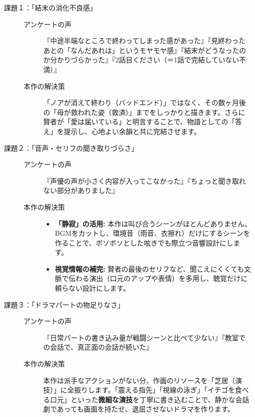 \begin{description}
    \item [課題１：「結末の消化不良感」] 
    \begin{description}
        \item []
        \item [アンケートの声] 『中途半端なところで終わってしまった感があった』『見終わったあとの「なんだあれは」というモヤモヤ感』『結末がどうなったのか分かりづらかった』『2話目ください（＝1話で完結していない不満）』
        \item [本作の解決策] 
        「ノアが消えて終わり（バッドエンド）」ではなく、その数ヶ月後の「母が救われた姿（救済）」までをしっかりと描きます。さらに賢者が「愛は届いている」と明言することで、物語としての「答え」を提示し、心地よい余韻と共に完結させます。
    \end{description}
    \item [課題２：「音声・セリフの聞き取りづらさ」] 
    \begin{description}
        \item []
        \item [アンケートの声] 『声優の声が小さく内容が入ってこなかった』『ちょっと聞き取れない部分がありました』
        \item [本作の解決策] 
            \begin{itemize}
                \item \textbf{「静寂」の活用:} 本作は叫び合うシーンがほとんどありません。BGMをカットし、環境音（雨音、衣擦れ）だけにするシーンを作ることで、ボソボソとした呟きでも際立つ音響設計にします。
                \item \textbf{視覚情報の補完:} 賢者の最後のセリフなど、聞こえにくくても文脈で伝わる演出（口元のアップや表情）を多用し、聴覚だけに頼らない設計にします。
            \end{itemize}
    \end{description}
    \item [課題３：「ドラマパートの物足りなさ」] 
    \begin{description}
        \item []
        \item [アンケートの声] 『日常パートの書き込み量が戦闘シーンと比べて少ない』『教室での会話で、真正面の会話が続いた』
        \item [本作の解決策] 
        本作は派手なアクションがない分、作画のリソースを「芝居（演技）」に全振りします。「震える指先」「視線の泳ぎ」「イチゴを食べる口元」といった\textbf{微細な演技}を丁寧に書き込むことで、静かな会話劇であっても画面を持たせ、退屈させないドラマを作ります。
    \end{description}
\end{description}


